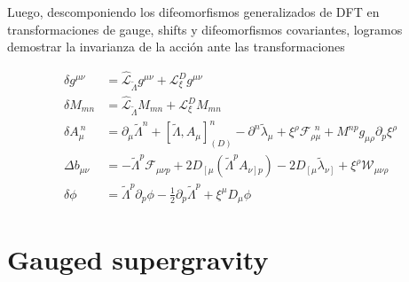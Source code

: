 \documentclass{article}
\numberwithin{equation}{section}
\begin{document}
\begin{boxumen}
	Luego, descomponiendo los difeomorfismos generalizados de DFT en transformaciones de gauge, shifts y difeomorfismos covariantes, logramos demostrar la invarianza de la acción ante las transformaciones
	
	\begin{equation}\label{DFTKKtransformation}
	\begin{aligned}
	\delta g^{\mu \nu} &= \hat{\mathcal{L}}_{\widetilde{\Lambda}} g^{\mu \nu} + \mathcal{L}_{\xi}^{D}  g^{\mu \nu}\\
	\delta M_{m n}&= \hat{\mathcal{L}}_{\widetilde{\Lambda}} M_{m n} + \mathcal{L}_{\xi}^D M_{m n}\\
	\delta A_{\mu}^{\ n} &=\partial_{\mu} \widetilde{\Lambda}^n + \left[ \widetilde{\Lambda}, A_{\mu}\right]_{(D)}^n - \partial^n \widetilde{\lambda}_{\mu} + \xi^{\rho} \mathcal{F}_{\rho \mu}^{\ \ n} + M^{n p} g_{\mu \rho} \partial_p \xi^{\rho}\\
	\Delta b_{\mu \nu} &= -\widetilde{\Lambda}^p \mathcal{F}_{\mu \nu p} + 2 D_{\left[ \mu \right.} \left( \widetilde{\Lambda}^p A_{\left.\nu\right] p} \right) - 2 D_{\left[\mu \right.} \widetilde{\lambda}_{\left.\nu \right]} + \xi^{\rho} \mathcal{W}_{\mu \nu \rho}\\
	\delta \phi &= \widetilde{\Lambda}^p \partial_p \phi - \frac{1}{2} \partial_p \widetilde{\Lambda}^p + \xi^{\mu} D_{\mu} \phi 
	\end{aligned}
	\end{equation}
	
	
\end{boxumen}


\section{Gauged supergravity}
\end{document}
